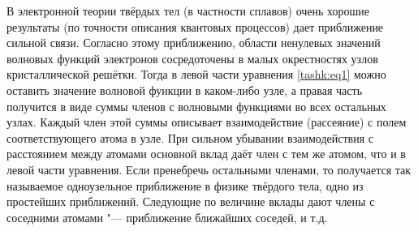 В электронной теории твёрдых тел (в частности сплавов) очень хорошие
результаты (по точности описания квантовых процессов) дает приближение
сильной связи. Согласно этому приближению, области ненулевых значений
волновых функций электронов сосредоточены в малых окрестностях узлов
кристаллической решётки. Тогда в левой части уравнения \eqref{tashk:eq1} можно оставить
значение волновой функции в каком-либо узле, а правая часть получится в виде
суммы членов с волновыми функциями во всех остальных узлах. Каждый член этой
суммы описывает взаимодействие (рассеяние) с полем соответствующего атома в
узле. При сильном убывании взаимодействия с расстоянием между атомами
основной вклад даёт член с тем же атомом, что и в левой части уравнения.
Если пренебречь остальными членами, то получается так называемое
одноузельное приближение в физике твёрдого тела, одно из простейших
приближений. Следующие по величине вклады дают члены с соседними атомами "---
приближение ближайших соседей, и т.д.


